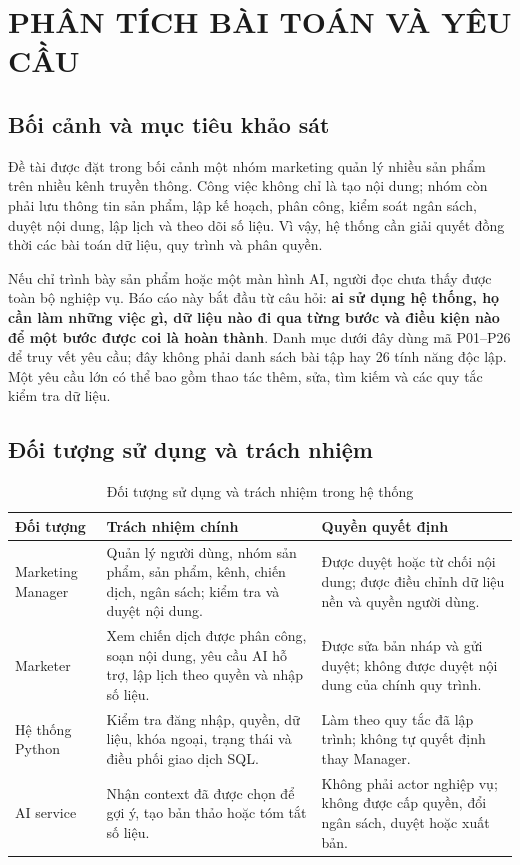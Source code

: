 \chapter{PHÂN TÍCH BÀI TOÁN VÀ YÊU CẦU}

\section{Bối cảnh và mục tiêu khảo sát}

Đề tài được đặt trong bối cảnh một nhóm marketing quản lý nhiều sản phẩm trên nhiều kênh truyền thông. Công việc không chỉ là tạo nội dung; nhóm còn phải lưu thông tin sản phẩm, lập kế hoạch, phân công, kiểm soát ngân sách, duyệt nội dung, lập lịch và theo dõi số liệu. Vì vậy, hệ thống cần giải quyết đồng thời các bài toán dữ liệu, quy trình và phân quyền.

Nếu chỉ trình bày sản phẩm hoặc một màn hình AI, người đọc chưa thấy được toàn bộ nghiệp vụ. Báo cáo này bắt đầu từ câu hỏi: \textbf{ai sử dụng hệ thống, họ cần làm những việc gì, dữ liệu nào đi qua từng bước và điều kiện nào để một bước được coi là hoàn thành}. Danh mục dưới đây dùng mã P01--P26 để truy vết yêu cầu; đây không phải danh sách bài tập hay 26 tính năng độc lập. Một yêu cầu lớn có thể bao gồm thao tác thêm, sửa, tìm kiếm và các quy tắc kiểm tra dữ liệu.

\section{Đối tượng sử dụng và trách nhiệm}

\begin{table}[h!]
\centering
\small
\caption{Đối tượng sử dụng và trách nhiệm trong hệ thống}
\begin{tabularx}{\textwidth}{|L{3.0cm}|Y|Y|}
\hline
\textbf{Đối tượng} & \textbf{Trách nhiệm chính} & \textbf{Quyền quyết định}\\\hline
Marketing Manager & Quản lý người dùng, nhóm sản phẩm, sản phẩm, kênh, chiến dịch, ngân sách; kiểm tra và duyệt nội dung. & Được duyệt hoặc từ chối nội dung; được điều chỉnh dữ liệu nền và quyền người dùng.\\\hline
Marketer & Xem chiến dịch được phân công, soạn nội dung, yêu cầu AI hỗ trợ, lập lịch theo quyền và nhập số liệu. & Được sửa bản nháp và gửi duyệt; không được duyệt nội dung của chính quy trình.\\\hline
Hệ thống Python & Kiểm tra đăng nhập, quyền, dữ liệu, khóa ngoại, trạng thái và điều phối giao dịch SQL. & Làm theo quy tắc đã lập trình; không tự quyết định thay Manager.\\\hline
AI service & Nhận context đã được chọn để gợi ý, tạo bản thảo hoặc tóm tắt số liệu. & Không phải actor nghiệp vụ; không được cấp quyền, đổi ngân sách, duyệt hoặc xuất bản.\\\hline
\end{tabularx}
\end{table}

